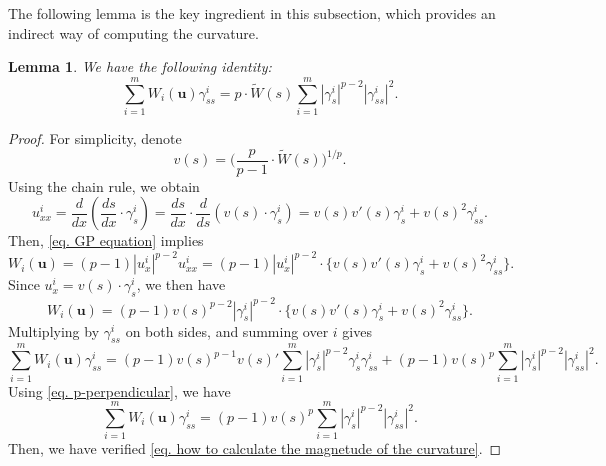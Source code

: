 \documentclass[11pt,twoside,reqno]{amsart}
\newtheorem{lemma}{Lemma}[section]
\numberwithin{equation}{section}
\begin{document}
The following lemma is the key ingredient in this subsection, which provides an indirect way of computing the curvature.
\begin{lemma}
    We have the following identity:
    \begin{equation}\label{eq. how to calculate the magnetude of the curvature}
        \sum_{i=1}^{m}W_{i}(\mathbf{u})\gamma^{i}_{ss}=p\cdot\widetilde{W}(s)\sum_{i=1}^{m}|\gamma^{i}_{s}|^{p-2}|\gamma^{i}_{ss}|^{2}.
    \end{equation}
\end{lemma}
\begin{proof}
    For simplicity, denote $$v(s)=\Big(\frac{p}{p-1}\cdot\widetilde{W}(s)\Big)^{1/p}.$$  Using the chain rule, we obtain
    \begin{equation*}
        u^{i}_{xx}=\frac{d}{dx}(\frac{ds}{dx}\cdot\gamma^{i}_{s})=\frac{ds}{dx}\cdot\frac{d}{ds}(v(s)\cdot\gamma^{i}_{s})=v(s)v'(s)\gamma^{i}_{s}+v(s)^{2}\gamma^{i}_{ss}.
    \end{equation*}
    Then, \eqref{eq. GP equation} implies
    \begin{equation*}
        W_{i}(\mathbf{u})=(p-1)|u^{i}_{x}|^{p-2}u^{i}_{xx}=(p-1)|u^{i}_{x}|^{p-2}\cdot\Big\{v(s)v'(s)\gamma^{i}_{s}+v(s)^{2}\gamma^{i}_{ss}\Big\}.
    \end{equation*}
    Since $u^{i}_{x}=v(s)\cdot\gamma^{i}_{s}$, we then have
    \begin{equation*}
        W_{i}(\mathbf{u})=(p-1)v(s)^{p-2}|\gamma^{i}_{s}|^{p-2}\cdot\Big\{v(s)v'(s)\gamma^{i}_{s}+v(s)^{2}\gamma^{i}_{ss}\Big\}.
    \end{equation*}
    Multiplying by $\gamma^{i}_{ss}$ on both sides, and summing over $i$ gives
    \begin{equation*}
        \sum_{i=1}^{m}W_{i}(\mathbf{u})\gamma^{i}_{ss}=(p-1)v(s)^{p-1}v(s)'\sum_{i=1}^{m}|\gamma^{i}_{s}|^{p-2}\gamma^{i}_{s}\gamma^{i}_{ss}+(p-1)v(s)^{p}\sum_{i=1}^{m}|\gamma^{i}_{s}|^{p-2}|\gamma^{i}_{ss}|^{2}.
    \end{equation*}
    Using \eqref{eq. p-perpendicular}, we have
    \begin{equation*}
        \sum_{i=1}^{m}W_{i}(\mathbf{u})\gamma^{i}_{ss}=(p-1)v(s)^{p}\sum_{i=1}^{m}|\gamma^{i}_{s}|^{p-2}|\gamma^{i}_{ss}|^{2}.
    \end{equation*}
    Then, we have verified \eqref{eq. how to calculate the magnetude of the curvature}.
\end{proof}
\end{document}
